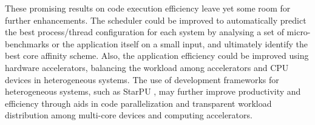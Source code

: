 These promising results on code execution efficiency leave yet some room for further enhancements. The scheduler could be improved to automatically predict the best process/thread configuration for each system by analysing a set of micro-benchmarks or the application itself on a small input, and ultimately identify the best core affinity scheme. Also, the application efficiency could be improved using hardware accelerators, balancing the workload among accelerators and CPU devices in heterogeneous systems. The use of development frameworks for heterogeneous systems, such as StarPU \cite{StarPU}, may further improve productivity and efficiency through aids in code parallelization and transparent workload distribution among multi-core devices and computing accelerators.
